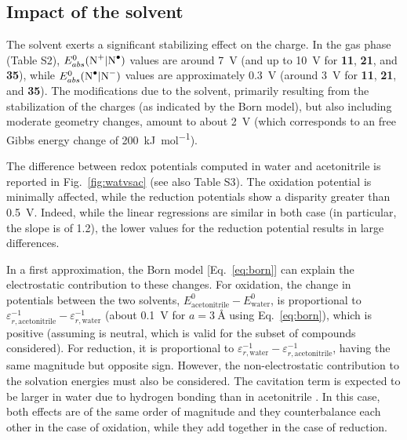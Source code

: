 \documentclass[review,preprint]{elsarticle}
\begin{document}
\clearpage

\subsection{Impact of the solvent} \label{sec:solv}

The solvent exerts a significant stabilizing effect on the charge. In the gas phase (Table S2), $E^0_{abs}(\ce{N+}|\ce{N^.})$ values are around \SI{7}{\volt} (and up to \SI{10}{\volt} for \textbf{11}, \textbf{21}, and \textbf{35}), while $E^0_{abs}(\ce{N^.}|\ce{N-})$ values are approximately \SI{0.3}{\volt} (around \SI{3}{\volt} for \textbf{11}, \textbf{21}, and \textbf{35}). The modifications due to the solvent, primarily resulting from the stabilization of the charges (as indicated by the Born model), but also including moderate geometry changes, amount to about \SI{2}{\volt} (which corresponds to an free Gibbs energy change of \SI{200}{\kilo\joule\per\mole}).

The difference between redox potentials computed in water and acetonitrile is reported in Fig.~\ref{fig:watvsac} (see also Table S3). The oxidation potential is minimally affected, while the reduction potentials show a disparity greater than \SI{0.5}{\volt}. Indeed, while the linear regressions are similar in both case (in particular, the slope is of 1.2), the lower values for the reduction potential results in large differences.

In a first approximation, the Born model [Eq.~\eqref{eq:born}] can explain the electrostatic contribution to these changes. For oxidation, the change in potentials between the two solvents, $E^0_{\text{acetonitrile}} - E^0_{\text{water}}$, is proportional to $\varepsilon_{r,\text{acetonitrile}}^{-1} - \varepsilon_{r,\text{water}}^{-1}$ (about \SI{0.1}{\volt} for $a = \SI{3}{\angstrom}$ using Eq.~\eqref{eq:born}), which is positive (assuming  is neutral, which is valid for the subset of compounds considered). For reduction, it is proportional to $\varepsilon_{r,\text{water}}^{-1} - \varepsilon_{r,\text{acetonitrile}}^{-1}$, having the same magnitude but opposite sign. However, the non-electrostatic contribution to the solvation energies must also be considered. The cavitation term is expected to be larger in water due to hydrogen bonding than in acetonitrile \cite{marenichUniversalSolvationModel2009}. In this case, both effects are of the same order of magnitude and they counterbalance each other in the case of oxidation, while they add together in the case of reduction.
\end{document}
